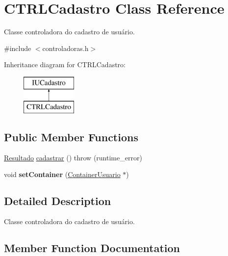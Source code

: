 \hypertarget{classCTRLCadastro}{}\section{C\+T\+R\+L\+Cadastro Class Reference}
\label{classCTRLCadastro}


Classe controladora do cadastro de usuário.  




{\ttfamily \#include $<$controladoras.\+h$>$}

Inheritance diagram for C\+T\+R\+L\+Cadastro\+:\begin{figure}[H]
\begin{center}
\leavevmode
\includegraphics[height=2.000000cm]{classCTRLCadastro}
\end{center}
\end{figure}
\subsection*{Public Member Functions}
\begin{DoxyCompactItemize}
\item 
\hyperlink{classResultado}{Resultado} \hyperlink{classCTRLCadastro_a22e15e47f34bb629a27204be76abf69c}{cadastrar} ()  throw (runtime\+\_\+error)
\item 
\mbox{\label{classCTRLCadastro_ad633d904984ff4bcd78baf8e20bcb09c}} 
void {\bfseries set\+Container} (\hyperlink{classContainerUsuario}{Container\+Usuario} $\ast$)
\end{DoxyCompactItemize}


\subsection{Detailed Description}
Classe controladora do cadastro de usuário. 

\subsection{Member Function Documentation}
\mbox{\label{classCTRLCadastro_a22e15e47f34bb629a27204be76abf69c}} 
